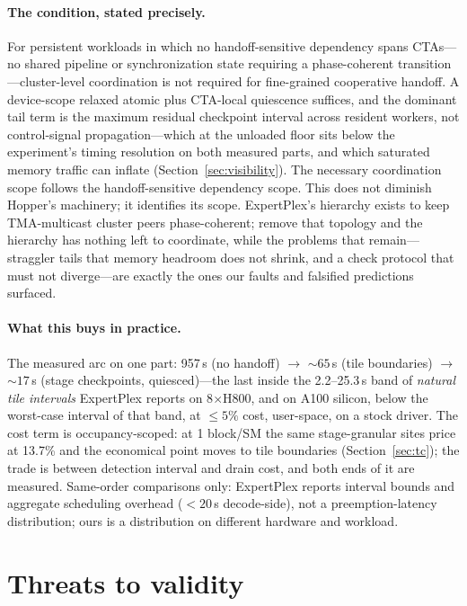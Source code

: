 \documentclass[11pt]{article}
\newcommand{\us}{\,\textmu s\xspace}
\begin{document}
\paragraph{The condition, stated precisely.} For persistent workloads
in which no handoff-sensitive dependency spans CTAs---no shared
pipeline or synchronization state requiring a phase-coherent
transition---cluster-level coordination is not required for
fine-grained cooperative handoff. A device-scope relaxed atomic plus
CTA-local quiescence suffices, and the dominant tail term is the
maximum residual checkpoint interval across resident workers, not
control-signal propagation---which at the unloaded floor sits below
the experiment's timing resolution on both measured parts, and which
saturated memory traffic can inflate
(Section~\ref{sec:visibility}). The necessary coordination scope
follows the handoff-sensitive dependency scope. This does not
diminish Hopper's machinery; it identifies its scope. ExpertPlex's
hierarchy exists to keep TMA-multicast cluster peers phase-coherent;
remove that topology and the hierarchy has nothing left to
coordinate, while the problems that remain---straggler tails that
memory headroom does not shrink, and a check protocol that must not
diverge---are exactly the ones our faults and falsified predictions
surfaced.

\paragraph{What this buys in practice.} The measured arc on one
part: 957\us{} (no handoff) ${\to}$ ${\sim}65$\us{} (tile
boundaries) ${\to}$ ${\sim}17$\us{} (stage checkpoints,
quiesced)---the last inside the 2.2--25.3\us{} band of \emph{natural
tile intervals} ExpertPlex reports on 8$\times$H800, and on A100
silicon, below the worst-case interval of that band, at ${\le}5\%$
cost, user-space, on a stock driver. The cost term is
occupancy-scoped: at 1 block/SM the same stage-granular sites price
at 13.7\% and the economical point moves to tile boundaries
(Section~\ref{sec:tc}); the trade is between detection interval and
drain cost, and both ends of it are measured. Same-order comparisons
only: ExpertPlex reports interval bounds and aggregate scheduling
overhead (${<}20$\us{} decode-side), not a preemption-latency
distribution; ours is a distribution on different hardware and
workload.

\section{Threats to validity}
\label{sec:threats}
\end{document}
